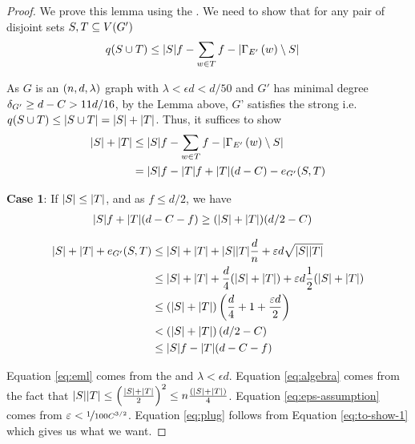 \documentclass[11pt]{article}
\begin{document}
\begin{proof}
  We prove this lemma using the .
  We need to show that for any pair of disjoint sets $S, T \subseteq \Vertices{G'}$
  \begin{align}
\OddComponents{S \cup T} &\le \Size{S}f - \sum_{w \in T} f - \Size{\Neighbourhood{E'}{w} \setminus S}
  \end{align}

As $G$ is an $\EnDeeLambda$ graph with $\lambda < \epsilon d < d/50$ and $G'$ has minimal degree $\MinimalDegree{G'} \ge d - C >  11d/16$, by the Lemma above, $G$' satisfies the strong  i.e. $\OddComponents{S \cup T} \le \Size{S \cup T} = |S| + |T|$.
  Thus, it suffices to show
  \begin{align}
    |S| + |T| &\le |S|f - \sum_{w \in T} f - \Size{\Neighbourhood{E'}{w} \setminus S}   \\
              &=\Size{S}f - \Size{T}f + \Size{T}(d-C) - \CutEdges{S}{T}{G'}  \label{eq:to-show}
  \end{align}  

  \textbf{Case 1}: If $\Size{S} \leq \Size{T}$, and as $f \leq d/2$, we have 
  \begin{align}
    \Size{S}f + \Size{T}(d-C-f)  &\ge (\Size{S} + \Size{T})(d/2 -C) \label{eq:to-show-1}
  \end{align}

\begin{align}
  |S| + |T| + \CutEdges{S}{T}{G'} &\le  |S| + |T| + |S||T|\frac{d}{n} + \epsilon d \sqrt{\Size{S}\Size{T}} \label{eq:eml}\\
                                 &\le |S| + |T| + \frac{d}{4}(\Size{S} + \Size{T}) + \epsilon d \frac{1}{2}(\Size{S} + \Size{T}) \label{eq:algebra}\\
                                 &\le (\Size{S} + \Size{T})\left(\frac{d}{4} + 1 + \frac{
                                   \epsilon d}{2}\right) \\
                                 &<  (\Size{S} + \Size{T})\left(d/2-C\right) \label{eq:eps-assumption}\\
                                 &\le \Size{S}f - \Size{T}(d-C-f) \label{eq:plug}
 \end{align}  
  
Equation \eqref{eq:eml} comes from the  and $\lambda < \epsilon d$.
Equation \eqref{eq:algebra} comes from the fact that $\Size{S}\Size{T} \leq \left(\frac{\Size{S}+\Size{T}}{2}\right)^2 \le n\frac{(\Size{S}+\Size{T})}{4}$.
Equation \eqref{eq:eps-assumption} comes from $\epsilon < \nicefrac{1}{100C^{3/2}}$.
Equation \eqref{eq:plug} follows from Equation \eqref{eq:to-show-1} which gives us what we want.


\end{proof}
\end{document}
